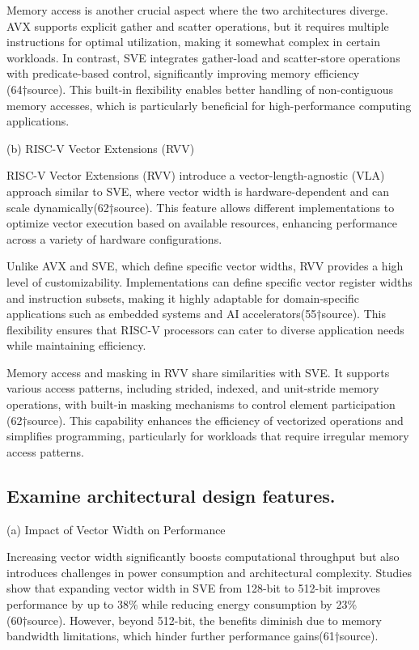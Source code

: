 \documentclass[conference]{IEEEtran}
\begin{document}
Memory access is another crucial aspect where the two architectures diverge. AVX supports explicit gather and scatter operations, but it requires multiple instructions for optimal utilization, making it somewhat complex in certain workloads. In contrast, SVE integrates gather-load and scatter-store operations with predicate-based control, significantly improving memory efficiency (64†source). This built-in flexibility enables better handling of non-contiguous memory accesses, which is particularly beneficial for high-performance computing applications.

(b) RISC-V Vector Extensions (RVV)

RISC-V Vector Extensions (RVV) introduce a vector-length-agnostic (VLA) approach similar to SVE, where vector width is hardware-dependent and can scale dynamically(62†source). This feature allows different implementations to optimize vector execution based on available resources, enhancing performance across a variety of hardware configurations.

Unlike AVX and SVE, which define specific vector widths, RVV provides a high level of customizability. Implementations can define specific vector register widths and instruction subsets, making it highly adaptable for domain-specific applications such as embedded systems and AI accelerators(55†source). This flexibility ensures that RISC-V processors can cater to diverse application needs while maintaining efficiency.

Memory access and masking in RVV share similarities with SVE. It supports various access patterns, including strided, indexed, and unit-stride memory operations, with built-in masking mechanisms to control element participation (62†source). This capability enhances the efficiency of vectorized operations and simplifies programming, particularly for workloads that require irregular memory access patterns.
\subsection{Examine architectural design features.}
(a) Impact of Vector Width on Performance

Increasing vector width significantly boosts computational throughput but also introduces challenges in power consumption and architectural complexity. Studies show that expanding vector width in SVE from 128-bit to 512-bit improves performance by up to 38\% while reducing energy consumption by 23\% (60†source). However, beyond 512-bit, the benefits diminish due to memory bandwidth limitations, which hinder further performance gains(61†source).
\end{document}
